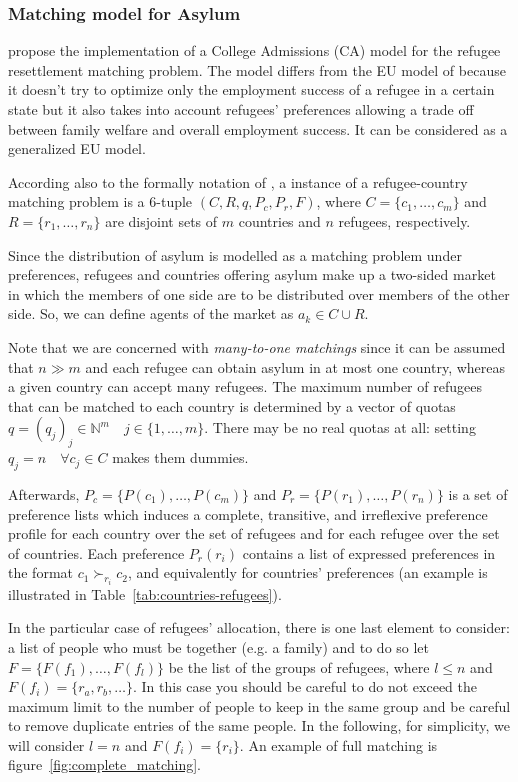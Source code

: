 \subsubsection{Matching model for Asylum}\label{matching-model-for-asylum}%
\citet{olbergml,basshuysen,delacretaz_2020,fernandez} propose the implementation of a College Admissions (CA) model for the refugee resettlement matching problem.
The model differs from the EU model of \citet{basshuysen} because it doesn't try to optimize only the employment success of a refugee in a certain state but it also takes into account refugees' preferences allowing a trade off between family welfare and overall employment success.
It can be considered as a generalized EU model.

According also to the formally notation of \citet{salles}, a instance of a refugee-country matching problem is a 6-tuple \((C, R, q, P_c, P_r, F)\), where \(C = \{c_1, \dots, c_m\}\) and \(R = \{r_1, \dots, r_n\}\) are disjoint sets of \(m\) countries and \(n\) refugees, respectively.

Since the distribution of asylum is modelled as a matching problem under preferences, refugees and countries offering asylum make up a two-sided market in which the members of one side are to be distributed over members of the other side.
So, we can define agents of the market as \(a_k \in C \cup R\).

Note that we are concerned with \textit{many-to-one matchings} since it can be assumed that \(n \gg m\) and each refugee can obtain asylum in at most one country, whereas a given country can accept many refugees. The maximum number of refugees that can be matched to each country is determined by a vector of quotas \(q = (q_j)_j \in \mathbb{N}^m \quad j\in\{1,\dots ,m\}\). There may be no real quotas at all: setting \(q_j = n \quad \forall c_j \in C\) makes them dummies.

Afterwards, \(P_c = \{P(c_1), \dots, P(c_m)\}\) and \(P_r =\{P(r_1), \dots, P(r_n)\}\) is a set of preference lists which induces a complete, transitive, and irreflexive preference profile for each country over the set of refugees and for each refugee over the set of countries.
Each preference \(P_r(r_i)\) contains a list of expressed preferences in the format \(c_1 \succ_{r_i} c_2\), and equivalently for countries' preferences (an example is illustrated in Table~\ref{tab:countries-refugees}).

In the particular case of refugees' allocation, there is one last element to consider: a list of people who must be together (e.g. a family) and to do so let \(F=\{F(f_1), \dots, F(f_l)\}\) be the list of the groups of refugees, where \(l \leq n\) and \(F(f_i) = \{r_a, r_b, \dots\}\).
In this case you should be careful to do not exceed the maximum limit to the number of people to keep in the same group and be careful to remove duplicate entries of the same people.
In the following, for simplicity, we will consider \(l=n\) and \(F(f_i)=\{r_i\}\).
An example of full matching is figure~\ref{fig:complete_matching}. %

